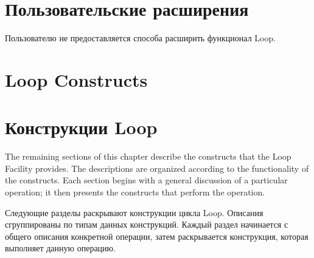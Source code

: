 \section{Пользовательские расширения}

Пользователю не предоставляется способа расширить функционал Loop.

\section{Loop Constructs}

\section{Конструкции Loop}

The remaining sections of this chapter describe the constructs that
the Loop Facility provides.  The descriptions are organized according
to the functionality of the constructs.  Each section begins with a
general discussion of a particular operation; it then presents the
constructs that perform the operation.

Следующие разделы раскрывают конструкции цикла Loop. Описания
сгруппированы по типам данных конструкций. Каждый раздел начинается с
общего описания конкретной операции, затем раскрывается конструкция,
которая выполняет данную операцию.

